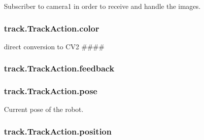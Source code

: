 Subscriber to camera1 in order to receive and handle the images. 

\subsubsection[{\texorpdfstring{color}{color}}]{\setlength{\rightskip}{0pt plus 5cm}track.\+Track\+Action.\+color}\hypertarget{classtrack_1_1TrackAction_abba894c7d22403050003dc50f5d79bba}{}\label{classtrack_1_1TrackAction_abba894c7d22403050003dc50f5d79bba}


direct conversion to C\+V2 \#\#\#\# 

\subsubsection[{\texorpdfstring{feedback}{feedback}}]{\setlength{\rightskip}{0pt plus 5cm}track.\+Track\+Action.\+feedback\hspace{0.3cm}{\ttfamily [static]}}\hypertarget{classtrack_1_1TrackAction_acce0064c9d83a91f00d92a854014cdf5}{}\label{classtrack_1_1TrackAction_acce0064c9d83a91f00d92a854014cdf5}
\subsubsection[{\texorpdfstring{pose}{pose}}]{\setlength{\rightskip}{0pt plus 5cm}track.\+Track\+Action.\+pose\hspace{0.3cm}{\ttfamily [static]}}\hypertarget{classtrack_1_1TrackAction_a25be61bbb562612dc1e1c5e7c448fa4c}{}\label{classtrack_1_1TrackAction_a25be61bbb562612dc1e1c5e7c448fa4c}


Current pose of the robot. 

\subsubsection[{\texorpdfstring{position}{position}}]{\setlength{\rightskip}{0pt plus 5cm}track.\+Track\+Action.\+position\hspace{0.3cm}{\ttfamily [static]}}\hypertarget{classtrack_1_1TrackAction_af8f5740ee3298f2c093006fe1314a268}{}\label{classtrack_1_1TrackAction_af8f5740ee3298f2c093006fe1314a268}


